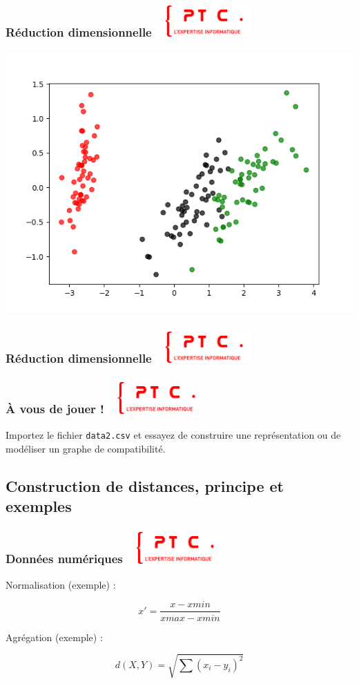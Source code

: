 \documentclass[11pt]{beamer}
\newenvironment{slide}[1]{%
\begin{frame}[environment=slide]
\frametitle{#1~\hfill~\includegraphics[height=1.2cm]{./epitech.png}}
}{%
\end{frame}
}
\newcommand{\Python}[1]{
	{\small	}
}
\begin{document}
\begin{slide}{Réduction dimensionnelle}
\begin{center}
\includegraphics[scale=0.4]{iris_acp}
\end{center}
\end{slide}

\begin{slide}{Réduction dimensionnelle}
\begin{center}
\Python{acp}
\end{center}
\end{slide}


\begin{slide}{{\`A} vous de jouer !}

Importez le fichier \texttt{data2.csv} et essayez de construire une représentation ou de modéliser un graphe de compatibilité.

\end{slide}

\subsection{Construction de distances, principe et exemples}

\begin{slide}{Données numériques}

Normalisation (exemple) : 

$$x' = \frac{x-xmin}{xmax-xmin}$$

Agrégation (exemple) :

$$ d(X,Y) = \sqrt{\sum(x_i-y_i)^2} $$

\end{slide}
\end{document}
